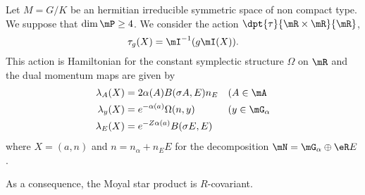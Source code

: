 \begin{proposition}
Let $M=G/K$ be an hermitian irreducible symmetric space of non compact type. We suppose that $\dim\mP\geq 4$. We consider the action $\dpt{ \tau }{  \mR\times\mR  }{ \mR }$,
\[ 
  \tau_g(X)=\mI^{-1}(g\mI(X)).
\]
This action is Hamiltonian for the constant symplectic structure $\Omega$ on $\mR$ and the dual momentum maps are given by
\begin{subequations}
\begin{align}
\lambda_A(X)&=2\alpha(A)B(\sigma A,E)n_E&&\text{(}A\in \mA\\
\lambda_y(X)&= e^{-\alpha(a)}\Omega(n,y)&&\text{(}y\in\mG_{\alpha}\\
\lambda_E(X)&= e^{-Z\alpha(a)}B(\sigma E,E)
\end{align}
\end{subequations}
where $X=(a,n)$ and $n=n_{\alpha}+n_EE$ for the decomposition $\mN=\mG_{\alpha}\oplus\eR E$.

As a consequence, the Moyal star product is $R$-covariant.

\end{proposition}


